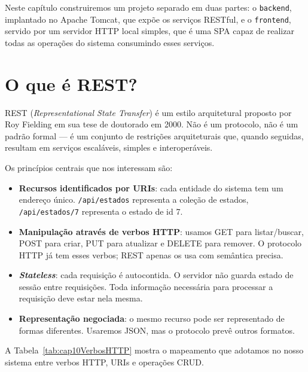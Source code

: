 Neste capítulo construiremos um projeto separado em duas partes: o \texttt{backend}, implantado no Apache Tomcat, que expõe os serviços RESTful, e o \texttt{frontend}, servido por um servidor HTTP local simples, que é uma SPA capaz de realizar todas as operações do sistema consumindo esses serviços.


\section{O que é REST?}

REST (\textit{Representational State Transfer}) é um estilo arquitetural proposto por Roy Fielding em sua tese de doutorado em 2000. Não é um protocolo, não é um padrão formal --- é um conjunto de restrições arquiteturais que, quando seguidas, resultam em serviços escaláveis, simples e interoperáveis.

Os princípios centrais que nos interessam são:

\begin{itemize}
    \item \textbf{Recursos identificados por URIs}: cada entidade do sistema tem um endereço único. \texttt{/api/estados} representa a coleção de estados, \texttt{/api/estados/7} representa o estado de id 7.
    \item \textbf{Manipulação através de verbos HTTP}: usamos GET para listar/buscar, POST para criar, PUT para atualizar e DELETE para remover. O protocolo HTTP já tem esses verbos; REST apenas os usa com semântica precisa.
    \item \textbf{\textit{Stateless}}: cada requisição é autocontida. O servidor não guarda estado de sessão entre requisições. Toda informação necessária para processar a requisição deve estar nela mesma.
    \item \textbf{Representação negociada}: o mesmo recurso pode ser representado de formas diferentes. Usaremos JSON, mas o protocolo prevê outros formatos.
\end{itemize}

A Tabela~\ref{tab:cap10VerbosHTTP} mostra o mapeamento que adotamos no nosso sistema entre verbos HTTP, URIs e operações CRUD.

